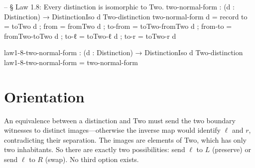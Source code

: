 \documentclass[11pt,a4paper]{book}
\def\texttt#1{#1}%
\begin{document}
\begin{code}
-- § Law 1.8: Every distinction is isomorphic to Two.
two-normal-form : (d : Distinction) → DistinctionIso d Two-distinction
two-normal-form d = record
  { to      = toTwo d
  ; from    = fromTwo d
  ; to-from = toTwo-fromTwo d
  ; from-to = fromTwo-toTwo d
  ; to-ℓ    = toTwo-ℓ d
  ; to-r    = toTwo-r d
  }

law1-8-two-normal-form : (d : Distinction) → DistinctionIso d Two-distinction
law1-8-two-normal-form = two-normal-form
\end{code}

\section{Orientation}

An equivalence between a distinction and \texttt{Two} must send the two boundary witnesses to distinct images—otherwise the inverse map would identify $\ell$ and $r$, contradicting their separation. The images are elements of \texttt{Two}, which has only two inhabitants. So there are exactly two possibilities: send $\ell$ to $L$ (preserve) or send $\ell$ to $R$ (swap). No third option exists.
\end{document}
